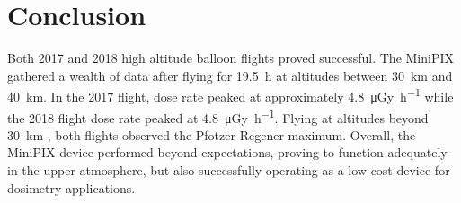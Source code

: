 \section{Conclusion}
\label{Conclusion}
Both 2017 and 2018 high altitude balloon flights proved successful.  
The MiniPIX gathered a wealth of data after flying for \SI{19.5}{\hour} at altitudes between \SI{30}{\kilo\meter} and \SI{40}{\kilo\meter}.  
In the 2017 flight, dose rate peaked at approximately \SI{4.8}{\micro\gray\per\hour} while the 2018 flight dose rate peaked at \SI{4.8}{\micro\gray\per\hour}.  
Flying at altitudes beyond \SI{30}{\kilo\meter} , both flights observed the Pfotzer-Regener maximum.
Overall, the MiniPIX device performed beyond expectations, proving to function adequately in the upper atmosphere, but also successfully operating as a low-cost device for dosimetry applications.
